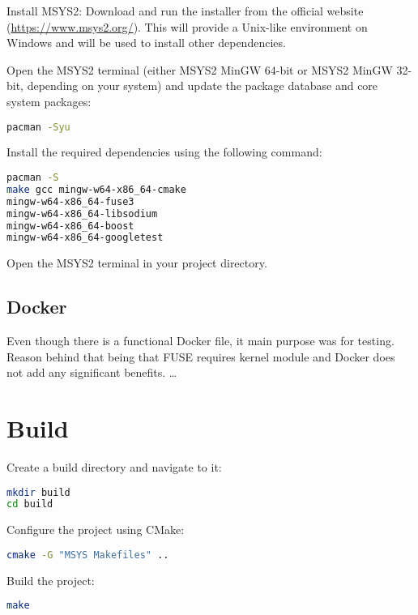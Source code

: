 Install MSYS2: Download and run the installer from the official website (\url{https://www.msys2.org/}). This will provide a Unix-like environment on Windows and will be used to install other dependencies.

Open the MSYS2 terminal (either MSYS2 MinGW 64-bit or MSYS2 MinGW 32-bit, depending on your system) and update the package database and core system packages:

\begin{lstlisting}[language=bash, basicstyle=\ttfamily\small]
pacman -Syu
\end{lstlisting}

Install the required dependencies using the following command:
\begin{lstlisting}[language=bash, basicstyle=\ttfamily\small]
pacman -S
make gcc mingw-w64-x86_64-cmake
mingw-w64-x86_64-fuse3
mingw-w64-x86_64-libsodium
mingw-w64-x86_64-boost
mingw-w64-x86_64-googletest
\end{lstlisting}

Open the MSYS2 terminal in your project directory.

\subsection*{Docker}

Even though there is a functional Docker file, it main purpose was for testing.
Reason behind that being that FUSE requires kernel module and Docker does not add any significant benefits.
\ldots

\section{Build}\label{sec:build}

Create a build directory and navigate to it:

\begin{lstlisting}[language=bash, basicstyle=\ttfamily\small]
mkdir build
cd build
\end{lstlisting}

Configure the project using CMake:
\begin{lstlisting}[language=bash, basicstyle=\ttfamily\small]
cmake -G "MSYS Makefiles" ..
\end{lstlisting}

Build the project:
\begin{lstlisting}[language=bash, basicstyle=\ttfamily\small]
make
\end{lstlisting}


